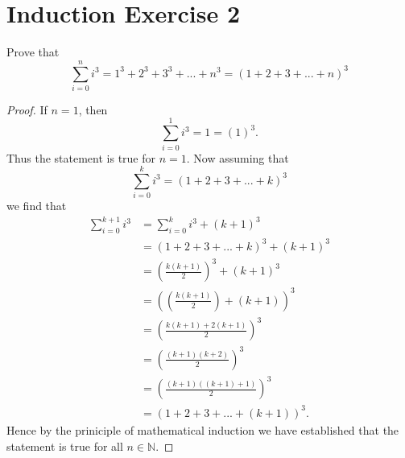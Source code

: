 \documentclass{article}
\begin{document}
\section*{Induction Exercise 2}
Prove that
\[
	\sum_{i=0}^{n} i^3 = 1^3 + 2^3 + 3^3 + ... + n^3 = (1+2+3+...+n)^3
\]
\begin{proof}
	If $n=1$, then
	\[
		\sum_{i=0}^{1} i^3 = 1 = (1)^3.
	\]
	Thus the statement is true for $n=1$.
	\newline\newline
	Now assuming that
	\[
		\sum_{i=0}^{k} i^3 = (1+2+3+...+k)^3
	\]
	we find that 
	\begin{align*}
		\sum_{i=0}^{k+1} i^3 & = \sum_{i=0}^{k} i^3 + (k+1)^3\\
				     & = (1+2+3+...+k)^3 + (k+1)^3 \\
				     & = \left( \frac{k(k+1)}{2} \right)^3 + (k+1)^3 \\
				     & = \left( \left( \frac{k(k+1)}{2} \right) + (k+1) \right)^3 \\
				     & = \left( \frac{k(k+1)+2(k+1)}{2} \right)^3 \\
				     & = \left( \frac{(k+1)(k+2)}{2} \right)^3 \\
				     & = \left( \frac{(k+1)((k+1)+1)}{2} \right)^3 \\
				     & = (1+2+3+...+(k+1))^3.
	\end{align*}
	Hence by the priniciple of mathematical induction we have established that the statement is true for all $n \in \mathbb{N}$.
\end{proof}
\end{document}
